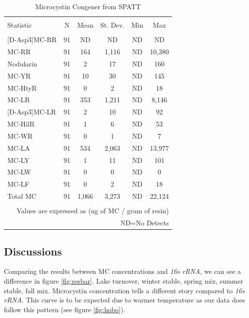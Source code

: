 \begin{table}[!ht]
\centering
  \caption{Microcystin Congener from SPATT}
  \label{tab:spattcongener}
\begin{tabular}{@{\extracolsep{5pt}}lccccc}
\\[-1.8ex]\hline
\hline \\[-1.8ex]
Statistic & \multicolumn{1}{c}{N} & \multicolumn{1}{c}{Mean} & \multicolumn{1}{c}{St. Dev.} & \multicolumn{1}{c}{Min} & \multicolumn{1}{c}{Max} \\
\hline \\[-1.8ex]
{[D-Asp3]}MC-RR & 91 & ND & ND & ND & ND \\
MC-RR & 91 & 164 & 1,116 & ND & 10,380 \\
Nodularin & 91 & 2 & 17 & ND & 160 \\
MC-YR & 91 & 10 & 30 & ND & 145 \\
MC-HtyR & 91 & 0 & 2 & ND & 18 \\
MC-LR & 91 & 353 & 1,211 & ND & 8,146 \\
{[D-Asp3]}MC-LR & 91 & 2 & 10 & ND & 92 \\
MC-HilR & 91 & 1 & 6 & ND & 53 \\
MC-WR & 91 & 0 & 1 & ND & 7 \\
MC-LA & 91 & 534 & 2,063 & ND & 13,977 \\
MC-LY & 91 & 1 & 11 & ND & 101 \\
MC-LW & 91 & 0 & 0 & ND & 0 \\
MC-LF & 91 & 0 & 2 & ND & 18 \\
Total MC & 91 & 1,066 & 3,273 & ND & 22,124 \\
\hline \\[-1.8ex]
\multicolumn{6}{r}{Values are expressed as (ng of MC / gram of resin)} \\
\multicolumn{6}{r}{ND=No Detects} \\
\end{tabular}
\end{table}


\clearpage
\newpage


\subsection{Discussions}

Comparing the results between MC concentrations and \emph{16s rRNA}, we can see a difference in figure \ref{fig:resbar}.
Lake turnover, winter stable, spring mix, summer stable, fall mix. 
Microcystin concentration tells a different story compared to \emph{16s rRNA}. This curve is to be expected due to warmer temperature as our data does follow this pattern (see figure \ref{fig:hobo}).


